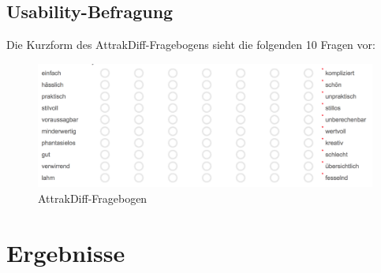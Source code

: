\subsection{Usability-Befragung}
Die Kurzform des AttrakDiff-Fragebogens sieht die folgenden 10 Fragen vor:
\begin{figure}[H]
 \centering
 \includegraphics[width=1\textwidth]{grafiken/attrak_diff_short.png}
 \caption{AttrakDiff-Fragebogen}
 \label{fig:attrakDiffFragebogen}
\end{figure}
\section{Ergebnisse}
